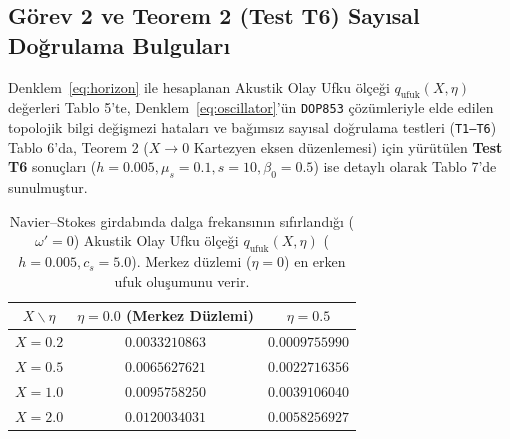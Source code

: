 \documentclass[12pt,a4paper]{article}
\begin{document}
\subsection{Görev 2 ve Teorem 2 (Test T6) Sayısal Doğrulama Bulguları}

Denklem~\eqref{eq:horizon} ile hesaplanan Akustik Olay Ufku ölçeği $q_{\mathrm{ufuk}}(X, \eta)$ değerleri Tablo 5'te, Denklem~\eqref{eq:oscillator}'ün \texttt{DOP853} çözümleriyle elde edilen topolojik bilgi değişmezi hataları ve bağımsız sayısal doğrulama testleri (\texttt{T1--T6}) Tablo 6'da, Teorem 2 ($X \to 0$ Kartezyen eksen düzenlemesi) için yürütülen \textbf{Test T6} sonuçları ($h = 0.005, \mu_s = 0.1, s = 10, \beta_0 = 0.5$) ise detaylı olarak Tablo 7'de sunulmuştur.

\begin{table}[htbp]
\centering
\caption{Navier--Stokes girdabında dalga frekansının sıfırlandığı ($\omega' = 0$) Akustik Olay Ufku ölçeği $q_{\mathrm{ufuk}}(X, \eta)$ ($h=0.005, c_s=5.0$). Merkez düzlemi ($\eta=0$) en erken ufuk oluşumunu verir.}
\vspace{0.15cm}
\begin{tabular}{c|cc}
\hline
$X \backslash \eta$ & $\eta = 0.0$ (Merkez Düzlemi) & $\eta = 0.5$ \\
\hline
$X = 0.2$ & $0.0033210863$ & $0.0009755990$ \\
$X = 0.5$ & $0.0065627621$ & $0.0022716356$ \\
$X = 1.0$ & $0.0095758250$ & $0.0039106040$ \\
$X = 2.0$ & $0.0120034031$ & $0.0058256927$ \\
\hline
\end{tabular}
\end{table}
\end{document}
